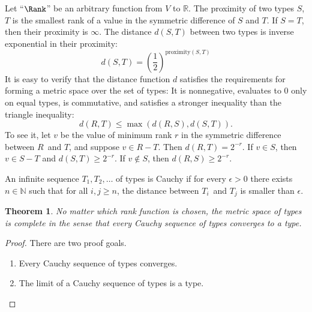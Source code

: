 \documentclass{amsart}
\newtheorem{theorem}[subsection]{Theorem}
\begin{document}

Let ``$\Rank$'' be an arbitrary function from $V$ to $\mathbb R$.
The proximity of two types $S$, $T$ is the smallest rank of a
value in the symmetric difference of $S$ and $T$. If $S=T$, then
their proximity is $\infty$. The distance $d(S, T)$ between two
types is inverse exponential in their proximity:
\[
d(S,T) =
\left(\frac12\right)^{\mathrm{proximity}(S, T)}
 \]
It is easy to verify that the distance function $d$ satisfies the
requirements for forming a metric space over the set of types:
It is nonnegative, evaluates to $0$ only on equal types, is
commutative, and satisfies a stronger inequality than the
triangle inequality:
\[
d(R,T)\le\max(d(R,S),d(S,T)).
\]
To see it, let $v$ be the value of minimum rank $r$ in the
symmetric difference between $R$~and $T$, and suppose $v\in R-T$.
Then $d(R, T)=2^{-r}$. If $v\in S$, then $v\in S-T$ and
$d(S,T)\ge2^{-r}$. If $v\notin S$, then $d(R, S)\ge2^{-r}$.


An infinite sequence $T_1,T_2,\ldots$ of types is Cauchy if for
every $\epsilon > 0$ there exists $n\in\mathbb N$ such that for
all $i,j\ge n$, the distance between $T_i$~and $T_j$ is smaller
than $\epsilon$.

\begin{theorem}
No matter which rank function is chosen, the metric space of
types is complete in the sense that every Cauchy sequence of
types converges to a type.
\end{theorem}

\begin{proof}
There are two proof goals.
\begin{enumerate}
\item Every Cauchy sequence of types converges.
\item The limit of a Cauchy sequence of types is a type.
\end{enumerate}


\end{proof}
\end{document}
